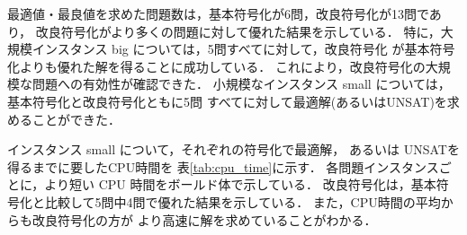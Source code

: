 最適値・最良値を求めた問題数は，基本符号化が6問，改良符号化が13問であり，
改良符号化がより多くの問題に対して優れた結果を示している．
特に，大規模インスタンス big については，5問すべてに対して，改良符号化
が基本符号化よりも優れた解を得ることに成功している．
これにより，改良符号化の大規模な問題への有効性が確認できた．
%
小規模なインスタンス small については，基本符号化と改良符号化ともに5問
すべてに対して最適解(あるいは\textsf{UNSAT})を求めることができた．


インスタンス small について，それぞれの符号化で最適解，
あるいは \textsf{UNSAT}を得るまでに要したCPU時間を
表\ref{tab:cpu_time}に示す．
各問題インスタンスごとに，より短い CPU 時間をボールド体で示している．
改良符号化は，基本符号化と比較して5問中4問で優れた結果を示している．
また，CPU時間の平均からも改良符号化の方が
より高速に解を求めていることがわかる．


